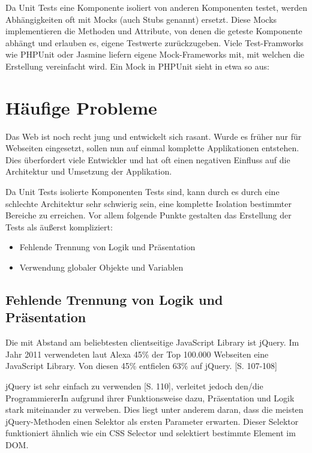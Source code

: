 \documentclass[a4paper,bibtotoc,oneside]{scrbook}
\begin{document}
Da Unit Tests eine Komponente isoliert von anderen Komponenten testet, werden Abhängigkeiten oft mit Mocks (auch Stubs genannt) ersetzt. Diese Mocks implementieren die Methoden und Attribute, von denen die geteste Komponente abhängt und erlauben es, eigene Testwerte zurückzugeben. Viele Test-Framworks wie PHPUnit oder Jasmine liefern eigene Mock-Frameworks mit, mit welchen die Erstellung vereinfacht wird. Ein Mock in PHPUnit sieht in etwa so aus:



\section{Häufige Probleme}
Das Web ist noch recht jung und entwickelt sich rasant. Wurde es früher nur für Webseiten eingesetzt, sollen nun auf einmal komplette Applikationen entstehen. Dies überfordert viele Entwickler und hat oft einen negativen Einfluss auf die Architektur und Umsetzung der Applikation.

Da Unit Tests isolierte Komponenten Tests sind, kann durch es durch eine schlechte Architektur sehr schwierig sein, eine komplette Isolation bestimmter Bereiche zu erreichen. Vor allem folgende Punkte gestalten das Erstellung der Tests als äußerst kompliziert:

\begin{itemize}
  \item Fehlende Trennung von Logik und Präsentation
  \item Verwendung globaler Objekte und Variablen
\end{itemize}


\subsection{Fehlende Trennung von Logik und Präsentation}
Die mit Abstand am beliebtesten clientseitige JavaScript Library ist jQuery. Im Jahr 2011 verwendeten laut Alexa 45\% der Top 100.000 Webseiten eine JavaScript Library. Von diesen 45\% entfielen 63\% auf jQuery. \cite{jquery}[S. 107-108]

jQuery ist sehr einfach zu verwenden \cite{jquery}[S. 110], verleitet jedoch den/die ProgrammiererIn aufgrund ihrer Funktionsweise dazu, Präsentation und Logik stark miteinander zu verweben. Dies liegt unter anderem daran, dass die meisten jQuery-Methoden einen Selektor als ersten Parameter erwarten. Dieser Selektor funktioniert ähnlich wie ein CSS Selector und selektiert bestimmte Element im DOM. \cite{jquery_selectors}
\end{document}
